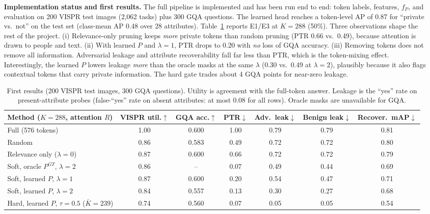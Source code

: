\documentclass[10pt]{article}
\newcommand{\R}{R}
\renewcommand{\Pr}{P}
\begin{document}
\textbf{Implementation status and first results.} The full pipeline is implemented and has been run end to end: token labels, features,
$f_P$, and evaluation on 200 VISPR test images (2,062 tasks) plus 300 GQA questions. The learned head reaches a token-level AP of 0.87 for ``private vs.\ not''
on the test set (class-mean AP 0.48 over 28 attributes). Table~\ref{tab:first} reports E1/E3 at $K{=}288$ (50\%).
Three observations shape the rest of the project.
(i) Relevance-only pruning keeps \emph{more} private tokens than random pruning (PTR 0.66 vs.\ 0.49), because attention is drawn to people and text.
(ii) With learned $\Pr$ and $\lambda{=}1$, PTR drops to 0.20 with \emph{no} loss of GQA accuracy.
(iii) Removing tokens does not remove all information. Adversarial leakage and attribute recoverability fall far less than PTR, which is the token-mixing effect.
Interestingly, the learned $\Pr$ lowers leakage \emph{more} than the oracle masks at the same $\lambda$ (0.30 vs.\ 0.49 at $\lambda{=}2$), plausibly because
it also flags contextual tokens that carry private information. The hard gate trades about 4 GQA points for near-zero leakage.

\begin{table}[h]
\centering\small
\setlength{\tabcolsep}{4.5pt}
\begin{tabular}{@{}lcccccc@{}}
\toprule
Method ($K{=}288$, attention $\R$) & VISPR util.$\uparrow$ & GQA acc.$\uparrow$ & PTR$\downarrow$ & Adv.\ leak$\downarrow$ & Benign leak$\downarrow$ & Recover.\ mAP$\downarrow$ \\
\midrule
Full (576 tokens) & 1.00 & 0.600 & 1.00 & 0.79 & 0.79 & 0.81 \\
Random & 0.86 & 0.583 & 0.49 & 0.72 & 0.72 & 0.80 \\
Relevance only ($\lambda{=}0$) & 0.87 & 0.600 & 0.66 & 0.72 & 0.72 & 0.79 \\
Soft, oracle $\Pr^{GT}$, $\lambda{=}2$ & 0.86 & -- & 0.07 & 0.49 & 0.44 & 0.69 \\
Soft, learned $\Pr$, $\lambda{=}1$ & 0.87 & 0.600 & 0.20 & 0.54 & 0.47 & 0.71 \\
Soft, learned $\Pr$, $\lambda{=}2$ & 0.84 & 0.557 & 0.13 & 0.30 & 0.27 & 0.68 \\
Hard, learned $\Pr$, $\tau{=}0.5$ ($\bar K{=}239$) & 0.74 & 0.560 & 0.07 & 0.05 & 0.05 & 0.54 \\
\bottomrule
\end{tabular}
\caption{First results (200 VISPR test images, 300 GQA questions). Utility is agreement with the full-token answer. Leakage is the ``yes'' rate on present-attribute probes
(false-``yes'' rate on absent attributes: at most 0.08 for all rows). Oracle masks are unavailable for GQA.}
\label{tab:first}
\vspace{-1em}
\end{table}
\end{document}
